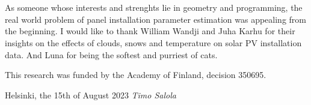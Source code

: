 \hypertarget{prefacepage}{}
%
\section*{\prefacename}
As someone whose interests and strenghts lie in geometry and programming, the real world problem of panel installation parameter estimation was appealing from the beginning. I would like to thank William Wandji and Juha Karhu for their insights on the effects of clouds, snows and temperature on solar PV installation data. And Luna for being the softest and purriest of cats.

\vspace{3mm}
\noindent This research was funded by the Academy of Finland, decision 350695.


\vspace{9mm}
\noindent
Helsinki, the 15th of August 2023 %
%
%
\vspace{11mm}
\hspace{1.6cm}\emph{Timo Salola}

\vfill















